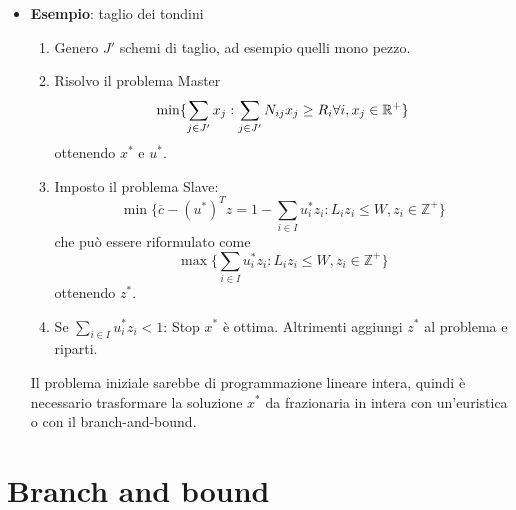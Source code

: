 \begin{itemize}
	\item \textbf{Esempio}: taglio dei tondini
	\begin{enumerate}
		\item Genero $J'$ schemi di taglio, ad esempio quelli mono pezzo.
		\item Risolvo il problema Master
		$$
		\min \{ \sum_{j \in J'} x_j : \sum_{j \in J'} N_{ij}x_j \geq R_i \forall i, x_j \in \mathbb{R}^+ \}
		$$
		ottenendo $x^*$ e $u^*$.
		\item Imposto il problema Slave:
		$$
		\min \{\overline{c} - (u^*)^Tz = 1 - \sum_{i \in I} u_{i}^*z_i : L_iz_i \leq W, z_i \in \mathbb{Z}^+ \}
		$$
		che può essere riformulato come
		$$
		\max \{\sum_{i \in I} u_{i}^*z_i : L_iz_i \leq W, z_i \in \mathbb{Z}^+ \}
		$$
		ottenendo $z^*$.
		\item Se $\sum_{i \in I} u_{i}^*z_i < 1$: Stop $x^*$ è ottima. Altrimenti aggiungi $z^*$ al problema e riparti.
	\end{enumerate} 
	Il problema iniziale sarebbe di programmazione lineare intera, quindi è necessario trasformare la soluzione $x^*$ da frazionaria in intera con un'euristica o con il branch-and-bound.
\end{itemize}


\section{Branch and bound}

